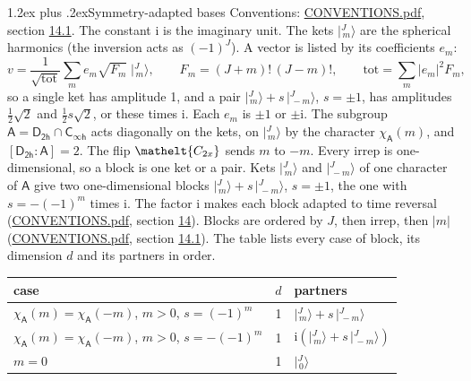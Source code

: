 \documentclass[10pt,a4paper]{article}
\makeatletter
\renewcommand\section{\@startsection{section}{1}{\z@}{-3ex plus -1ex minus -.2ex}%
  {1.2ex plus .2ex}{\normalfont\large\sffamily\bfseries\color{parttitle}}}
\numberwithin{equation}{section}
\newcommand{\eltfont}[1]{{\let\sigma\eltsigma\mathelt{#1}}}
\newcommand{\grp}[1]{\mathsf{#1}}
\newcommand{\elt}[1]{\eltfont{#1}}
\newcommand{\grpindex}[2]{[#1 : #2]}
\newcommand{\iunit}{\mathrm{i}}
\newcommand{\chiA}{\chi_{\grp{A}}}
\newcommand{\jm}[2]{\bigl\lvert{}^{#1}_{\,#2}\bigr\rangle}
\makeatother
\begin{document}
\section{Symmetry-adapted bases}\label{s:bases}
Conventions: \href{../../CONVENTIONS.pdf}{CONVENTIONS.pdf}, section \href{../../CONVENTIONS.pdf\#conv.14.1}{14.1}.
The constant $\iunit$ is the imaginary unit.
\leavevmode\label{n:index.m}\label{n:vector.ket}The kets $\jm{J}{m}$ are the spherical harmonics (the inversion acts as $(-1)^J$). \label{n:index.ketcoefficient}\label{n:vector.basis.symmetry}\label{n:index.ketweight}\label{n:index.total}A vector is listed by its coefficients $e_m$:
\begin{equation}\label{e:ket}v = \frac{1}{\sqrt{\mathrm{tot}}}\sum_m e_m\sqrt{F_m}\;\jm{J}{m},\qquad F_m = (J+m)!\,(J-m)!,\qquad \mathrm{tot} = \sum_m |e_m|^2F_m,\end{equation}
\leavevmode\label{n:index.pair.sign}so a single ket has amplitude 1, and a pair $\jm{J}{m} + s\,\jm{J}{-m}$, $s = \pm1$, has amplitudes $\tfrac{1}{2}\sqrt{2}$ and $\tfrac{1}{2}s\sqrt{2}$, or these times $\iunit$. Each $e_m$ is $\pm1$ or $\pm\iunit$.
\leavevmode\label{n:group.A}\label{n:function.character.abelian}The subgroup $\grp{A} = \grp{D_{2h}}\cap\grp{C_{\infty h}}$ acts diagonally on the kets, on $\jm{J}{m}$ by the character $\chiA(m)$, and $\grpindex{\grp{D_{2h}}}{\grp{A}} = 2$. The flip $\elt{C_{2x}}$ sends $m$ to $-m$. Every irrep is one-dimensional, so a block is one ket or a pair. Kets $\jm{J}{m}$ and $\jm{J}{-m}$ of one character of $\grp{A}$ give two one-dimensional blocks $\jm{J}{m} + s\,\jm{J}{-m}$, $s = \pm1$, the one with $s = -(-1)^m$ times $\iunit$. The factor $\iunit$ makes each block adapted to time reversal (\href{../../CONVENTIONS.pdf}{CONVENTIONS.pdf}, section \href{../../CONVENTIONS.pdf\#conv.14}{14}). Blocks are ordered by $J$, then irrep, then $|m|$ (\href{../../CONVENTIONS.pdf}{CONVENTIONS.pdf}, section \href{../../CONVENTIONS.pdf\#conv.14.1}{14.1}).
\leavevmode\label{n:head.case}\label{n:head.partners}The table lists every case of block, its dimension $d$ and its partners in order.
\begin{center}\begin{tabular}{@{}lrl@{}}\toprule
case & $d$ & partners\\\midrule
$\chiA(m) = \chiA(-m)$, $m > 0$, $s = (-1)^m$ & 1 & $\jm{J}{m} + s\,\jm{J}{-m}$\\
$\chiA(m) = \chiA(-m)$, $m > 0$, $s = -(-1)^m$ & 1 & $\iunit(\jm{J}{m} + s\,\jm{J}{-m})$\\
$m = 0$ & 1 & $\jm{J}{0}$\\
\bottomrule\end{tabular}\end{center}
\end{document}
